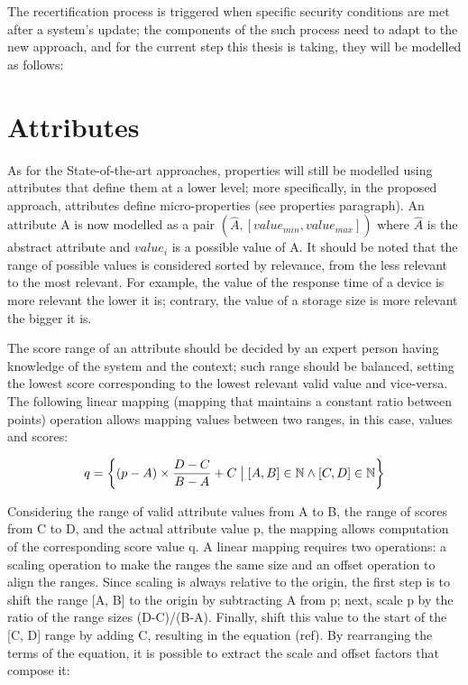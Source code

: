 The recertification process is triggered when specific security conditions are met after a system's update; the components of the such process need to adapt to the new approach, and for the current step this thesis is taking, they will be modelled as follows:

\section{Attributes}
As for the State-of-the-art approaches, properties will still be modelled using attributes that define them at a lower level; more specifically, in the proposed approach, attributes define micro-properties (see properties paragraph). An attribute A is now modelled as a pair \((\hat{A}, [value_{min}, value_{max}])\) where \(\hat{A}\) is the abstract attribute and \(value_{i}\) is a possible value of A. It should be noted that the range of possible values is considered sorted by relevance, from the less relevant to the most relevant. For example, the value of the response time of a device is more relevant the lower it is; contrary, the value of a storage size is more relevant the bigger it is.

The score range of an attribute should be decided by an expert person having knowledge of the system and the context; such range should be balanced, setting the lowest score corresponding to the lowest relevant valid value and vice-versa.
The following linear mapping (mapping that maintains a constant ratio between points) operation allows mapping values between two ranges, in this case, values and scores:

\[q = \left \{ (p - A) \times \frac{D - C}{B - A} + C \bigm| [A, B] \in \mathbb{N} \wedge [C, D] \in \mathbb{N}  \right \} \]

Considering the range of valid attribute values from A to B, the range of scores from C to D, and the actual attribute value p, the mapping allows computation of the corresponding score value q.
A linear mapping requires two operations: a scaling operation to make the ranges the same size and an offset operation to align the ranges. Since scaling is always relative to the origin, the first step is to shift the range [A, B] to the origin by subtracting A from p; next, scale p by the ratio of the range sizes (D-C)/(B-A). Finally, shift this value to the start of the [C, D] range by adding C, resulting in the equation (ref). By rearranging the terms of the equation, it is possible to extract the scale and offset factors that compose it:

